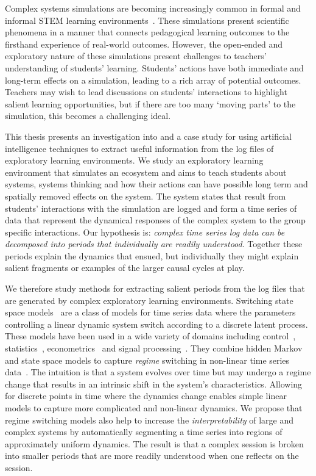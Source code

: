 Complex systems simulations are becoming increasingly common in formal and informal STEM learning environments~\citep{smordal2012hybrid}. These simulations present scientific phenomena in a manner that connects pedagogical learning outcomes to the firsthand experience of real-world outcomes. However, the open-ended and exploratory nature of these simulations present challenges to teachers' understanding of students' learning. Students' actions have both immediate and long-term effects on a simulation, leading to a rich array of potential outcomes. Teachers may wish to lead discussions on students' interactions to highlight salient learning opportunities, but if there are too many `moving parts' to the simulation, this becomes a challenging ideal.

This thesis presents an investigation into and a case study for using artificial intelligence techniques to extract useful information from the log files of exploratory learning environments. We study an exploratory learning environment that simulates an ecosystem and aims to teach students about systems, systems thinking and how their actions can have possible long term and spatially removed effects on the system. The system states that result from students' interactions with the simulation are logged and form a time series of data that represent the dynamical responses of the complex system to the group specific interactions. Our hypothesis is: \textit{complex time series log data can be decomposed into periods that individually are readily understood}. Together these periods explain the dynamics that ensued, but individually they might explain salient fragments or examples of the larger causal cycles at play.

We therefore study methods for extracting salient periods from the log files that are generated by complex exploratory learning environments. Switching state space models~\citep{ghahramani2000variational} are a class of models for time series data where the parameters controlling a linear dynamic system switch according to a discrete latent process. These models have been used in a wide variety of domains including control~\citep{ikoma2002tracking}, statistics~\citep{cappe2009inference}, econometrics~\citep{giordani2007unified} and signal processing~\citep{kim1999state}. They combine hidden Markov and state space models to capture \textit{regime} switching in non-linear time series data~\citep{whiteley2010efficient}. The intuition is that a system evolves over time but may undergo a regime change that results in an intrinsic shift in the system's characteristics. Allowing for discrete points in time where the dynamics change enables simple linear models to capture more complicated and non-linear dynamics. We propose that regime switching models also help to increase the \textit{interpretability} of large and complex systems by automatically segmenting a time series into regions of approximately uniform dynamics. The result is that a complex session is broken into smaller periods that are more readily understood when one reflects on the session.

